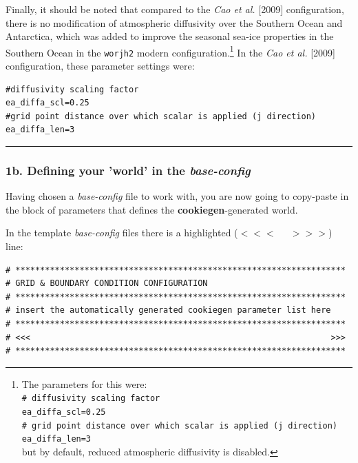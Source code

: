 \begin{itemize}[noitemsep]
\vspace{1mm}
Finally, it should be noted that compared to the \textit{Cao et al.} [2009] configuration, there is no modification of atmospheric diffusivity over the Southern Ocean and Antarctica, which was added to improve the seasonal sea-ice properties in the Southern Ocean in the \texttt{worjh2} modern configuration.\footnote{The parameters for this were:
\\\texttt{\# diffusivity scaling factor}
\\\texttt{ea\_diffa\_scl=0.25}
\\\texttt{\# grid point distance over which scalar is applied (j direction)}
\\\texttt{ea\_diffa\_len=3}
\\but by default, reduced atmospheric diffusivity is disabled.} In the \textit{Cao et al.} [2009] configuration, these parameter settings were:

\footnotesize\vspace{-2pt}\begin{verbatim}
#diffusivity scaling factor
ea_diffa_scl=0.25
#grid point distance over which scalar is applied (j direction)
ea_diffa_len=3
\end{verbatim}\vspace{-2pt}\normalsize

\end{itemize}

\vspace{1mm}\noindent\rule{4cm}{0.5pt}\vspace{2mm}

\newpage

\subsubsection{1b. Defining your 'world' in the \textit{base-config}}

Having chosen a \textit{base-config} file to work with, you are now going to copy-paste in the block of parameters that defines the \textbf{cookiegen}-generated world.

\vspace{2mm}
\noindent In the template \textit{base-config} files there is a highlighted (\(<<<\;\;\;\;\;>>>\)) line:
\footnotesize\vspace{-2pt}\begin{verbatim}
# *******************************************************************
# GRID & BOUNDARY CONDITION CONFIGURATION
# *******************************************************************
# insert the automatically generated cookiegen parameter list here
# *******************************************************************
# <<<                                                             >>>
# *******************************************************************
\end{verbatim}\vspace{-2pt}\normalsize

